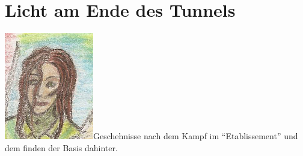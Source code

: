 \documentclass[11pt]{article}
\begin{document}
\section{Licht am Ende des Tunnels}

\includegraphics{sskreszta-portrait-alt-klein.png}Geschehnisse
nach dem Kampf im ``Etablissement'' und dem finden der Basis dahinter.
\end{document}
